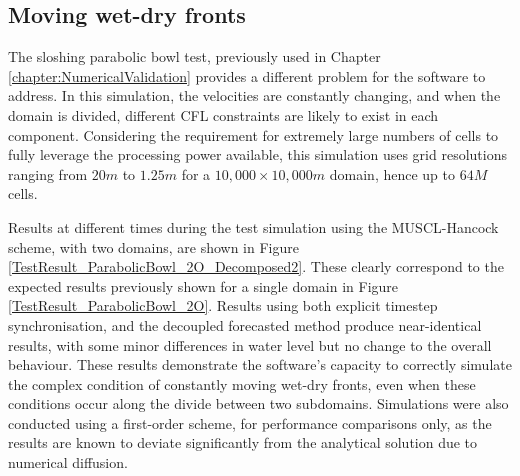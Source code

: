 \subsection{Moving wet-dry fronts}

The sloshing parabolic bowl test, previously used in Chapter \ref{chapter:NumericalValidation} provides a different problem for the software to address. In this simulation, the velocities are constantly changing, and when the domain is divided, different CFL constraints are likely to exist in each component. Considering the requirement for extremely large numbers of cells to fully leverage the processing power available, this simulation uses grid resolutions ranging from $20m$ to $1.25m$ for a $10,000 \times 10,000m$ domain, hence up to $64M$ cells.

Results at different times during the test simulation using the MUSCL-Hancock scheme, with two domains, are shown in Figure \ref{TestResult_ParabolicBowl_2O_Decomposed2}. These clearly correspond to the expected results previously shown for a single domain in Figure \ref{TestResult_ParabolicBowl_2O}. Results using both explicit timestep synchronisation, and the decoupled forecasted method produce near-identical results, with some minor differences in water level but no change to the overall behaviour. These results demonstrate the software's capacity to correctly simulate the complex condition of constantly moving wet-dry fronts, even when these conditions occur along the divide between two subdomains. Simulations were also conducted using a first-order scheme, for performance comparisons only, as the results are known to deviate significantly from the analytical solution due to numerical diffusion. 

